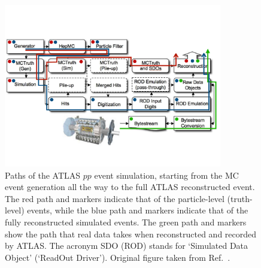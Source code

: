 {\color{red}{How is pileup simulated?}}

\begin{figure}[!htb]
    \begin{center}
        \includegraphics[width=0.85\textwidth]{figures/event_simulation/atlas_sim_structure_arrPDF}
        \caption{
            Paths of the ATLAS $pp$ event simulation, starting from the MC event generation all the way
            to the full ATLAS reconstructed event.
            The red path and markers indicate that of the particle-level (truth-level) events,
            while the blue path and markers indicate that of the fully reconstructed simulated events.
            The green path and markers show the path that real data takes when reconstructed and recorded by ATLAS.
            The acronym SDO (ROD) stands for `Simulated Data Object' (`ReadOut Driver').
            Original figure taken from Ref.~\cite{ATLASSim}.
        }
        \label{fig:atlas_sim_structure}
    \end{center}
\end{figure}
